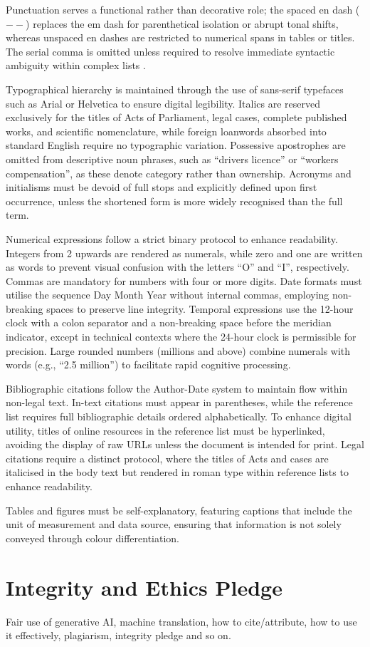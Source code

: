 \documentclass[12pt, a4paper]{article}
\begin{document}
Punctuation serves a functional rather than decorative role; the spaced en dash ($--$) replaces the em dash for parenthetical isolation or abrupt tonal shifts, whereas unspaced en dashes are restricted to numerical spans in tables or titles. The serial comma is omitted unless required to resolve immediate syntactic ambiguity within complex lists \citep{stone_chasing_2017}.

Typographical hierarchy is maintained through the use of sans-serif typefaces such as Arial or Helvetica to ensure digital legibility. Italics are reserved exclusively for the titles of Acts of Parliament, legal cases, complete published works, and scientific nomenclature, while foreign loanwords absorbed into standard English require no typographic variation. Possessive apostrophes are omitted from descriptive noun phrases, such as ``drivers licence'' or ``workers compensation'', as these denote category rather than ownership. Acronyms and initialisms must be devoid of full stops and explicitly defined upon first occurrence, unless the shortened form is more widely recognised than the full term.

Numerical expressions follow a strict binary protocol to enhance readability. Integers from 2 upwards are rendered as numerals, while zero and one are written as words to prevent visual confusion with the letters ``O'' and ``I'', respectively. Commas are mandatory for numbers with four or more digits. Date formats must utilise the sequence Day Month Year without internal commas, employing non-breaking spaces to preserve line integrity. Temporal expressions use the 12-hour clock with a colon separator and a non-breaking space before the meridian indicator, except in technical contexts where the 24-hour clock is permissible for precision. Large rounded numbers (millions and above) combine numerals with words (e.g., ``2.5 million'') to facilitate rapid cognitive processing.

Bibliographic citations follow the Author-Date system to maintain flow within non-legal text. In-text citations must appear in parentheses, while the reference list requires full bibliographic details ordered alphabetically. To enhance digital utility, titles of online resources in the reference list must be hyperlinked, avoiding the display of raw URLs unless the document is intended for print. Legal citations require a distinct protocol, where the titles of Acts and cases are italicised in the body text but rendered in roman type within reference lists to enhance readability.

Tables and figures must be self-explanatory, featuring captions that include the unit of measurement and data source, ensuring that information is not solely conveyed through colour differentiation.

\section{Integrity and Ethics Pledge}
Fair use of generative AI, machine translation, how to cite/attribute, how to use it effectively, plagiarism, integrity pledge and so on.


\printbibliography{}
\end{document}
